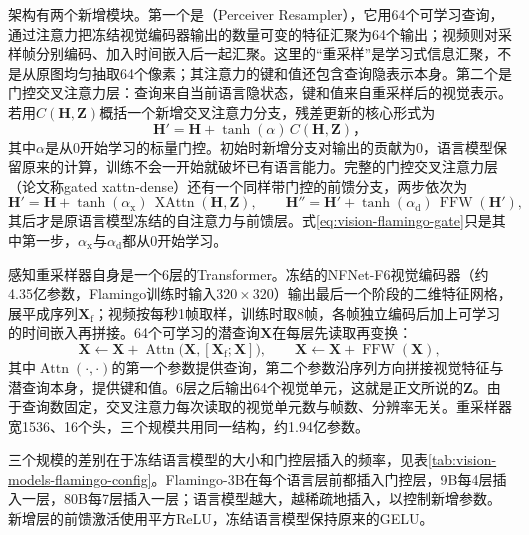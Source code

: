 架构有两个新增模块。第一个是（Perceiver Resampler），它用64个可学习查询，通过注意力把冻结视觉编码器输出的数量可变的特征汇聚为64个输出；视频则对采样帧分别编码、加入时间嵌入后一起汇聚。这里的“重采样”是学习式信息汇聚，不是从原图均匀抽取64个像素；其注意力的键和值还包含查询隐表示本身。第二个是门控交叉注意力层：查询来自当前语言隐状态，键和值来自重采样后的视觉表示。若用$C(\bm H,\bm Z)$概括一个新增交叉注意力分支，残差更新的核心形式为
\begin{equation}
  \bm H'=\bm H+\tanh(\alpha)\,C(\bm H,\bm Z)\text{，}
  \label{eq:vision-flamingo-gate}
\end{equation}
其中$\alpha$是从0开始学习的标量门控。初始时新增分支对输出的贡献为0，语言模型保留原来的计算，训练不会一开始就破坏已有语言能力。完整的门控交叉注意力层（论文称gated xattn-dense）还有一个同样带门控的前馈分支，两步依次为
\begin{equation}
  \bm H'=\bm H+\tanh(\alpha_{\mathrm{x}})\,\operatorname{XAttn}(\bm H,\bm Z),
  \qquad
  \bm H''=\bm H'+\tanh(\alpha_{\mathrm{d}})\,\operatorname{FFW}(\bm H'),
  \label{eq:vision-flamingo-block}
\end{equation}
其后才是原语言模型冻结的自注意力与前馈层。式\eqref{eq:vision-flamingo-gate}只是其中第一步，$\alpha_{\mathrm x}$与$\alpha_{\mathrm d}$都从0开始学习。

感知重采样器自身是一个6层的Transformer。冻结的NFNet-F6视觉编码器（约4.35亿参数，Flamingo训练时输入$320\times320$）输出最后一个阶段的二维特征网格，展平成序列$\bm X_{\mathrm f}$；视频按每秒1帧取样，训练时取8帧，各帧独立编码后加上可学习的时间嵌入再拼接。64个可学习的潜查询$\bm X$在每层先读取再变换：
\[
  \bm X\leftarrow\bm X+\operatorname{Attn}\bigl(\bm X,[\bm X_{\mathrm f};\bm X]\bigr),
  \qquad
  \bm X\leftarrow\bm X+\operatorname{FFW}(\bm X),
\]
其中$\operatorname{Attn}(\cdot,\cdot)$的第一个参数提供查询，第二个参数沿序列方向拼接视觉特征与潜查询本身，提供键和值。6层之后输出64个视觉单元，这就是正文所说的$\bm Z$。由于查询数固定，交叉注意力每次读取的视觉单元数与帧数、分辨率无关。重采样器宽1536、16个头，三个规模共用同一结构，约1.94亿参数。

三个规模的差别在于冻结语言模型的大小和门控层插入的频率，见表\ref{tab:vision-models-flamingo-config}。Flamingo-3B在每个语言层前都插入门控层，9B每4层插入一层，80B每7层插入一层；语言模型越大，越稀疏地插入，以控制新增参数。新增层的前馈激活使用平方ReLU，冻结语言模型保持原来的GELU。

